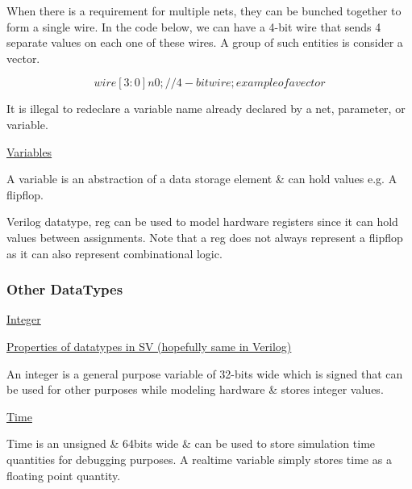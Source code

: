 \documentclass{article}
\begin{document}
	When there is a requirement for multiple nets, they can be bunched together to form a single wire. In the code below, we can have 
	a 4-bit wire that sends 4 separate values on each one of these wires. A group of such entities is consider a vector. 

	\[ wire [3:0] n0; // 4-bit wire; example of a vector \]

	It is illegal to redeclare a variable name already declared by a net, parameter, or variable. \newline \newline

	\underline{Variables} \newline \newline

	A variable is an abstraction of a data storage element \& can hold values e.g. A flip\-flop. \newline

	Verilog data\-type, reg can be used to model hardware registers since it can hold values between assignments. Note that a reg does not always represent a flip\-flop as it can also represent 
	combinational logic. \newline

	\subsubsection{Other Data\-Types}

	\underline{Integer} \newline \newline 

	\href{https://www.chipverify.com/systemverilog/systemverilog-datatypes}{Properties of data\-types in SV (hopefully same in Verilog)} \newline \newline 

	An integer is a general purpose variable of 32-bits wide which is signed that can be used for other purposes while modeling hardware \& stores integer values.\newline \newline 

	\underline{Time} \newline \newline 

	Time is an unsigned \& 64\-bits wide \& can be used to store simulation time quantities for debugging purposes. A realtime variable simply stores time as a floating point quantity. \newline \newline 
\end{document}
